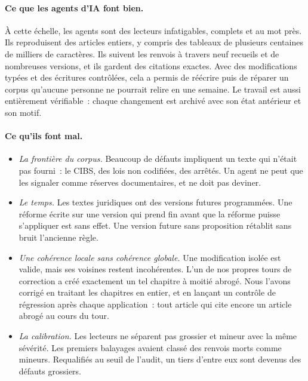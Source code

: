\documentclass[11pt,a4paper]{article}
\begin{document}
\paragraph{Ce que les agents d'IA font bien.}
À cette échelle, les agents sont des lecteurs infatigables, complets et au mot près. Ils reproduisent des articles entiers, y compris des tableaux de plusieurs centaines de milliers de caractères. Ils suivent les renvois à travers neuf recueils et de nombreuses versions, et ils gardent des citations exactes. Avec des modifications typées et des écritures contrôlées, cela a permis de réécrire puis de réparer un corpus qu'aucune personne ne pourrait relire en une semaine. Le travail est aussi entièrement vérifiable~: chaque changement est archivé avec son état antérieur et son motif.

\paragraph{Ce qu'ils font mal.}
\begin{itemize}
  \item \emph{La frontière du corpus.} Beaucoup de défauts impliquent un texte qui n'était pas fourni~: le CIBS, des lois non codifiées, des arrêtés. Un agent ne peut que les signaler comme réserves documentaires, et ne doit pas deviner.
  \item \emph{Le temps.} Les textes juridiques ont des versions futures programmées. Une réforme écrite sur une version qui prend fin avant que la réforme puisse s'appliquer est sans effet. Une version future sans proposition rétablit sans bruit l'ancienne règle.
  \item \emph{Une cohérence locale sans cohérence globale.} Une modification isolée est valide, mais ses voisines restent incohérentes. L'un de nos propres tours de correction a créé exactement un tel chapitre à moitié abrogé. Nous l'avons corrigé en traitant les chapitres en entier, et en lançant un contrôle de régression après chaque application~: tout article qui cite encore un article abrogé au cours du tour.
  \item \emph{La calibration.} Les lecteurs ne séparent pas grossier et mineur avec la même sévérité. Les premiers balayages avaient classé des renvois morts comme mineurs. Requalifiés au seuil de l'audit, un tiers d'entre eux sont devenus des défauts grossiers.
\end{itemize}
\end{document}
